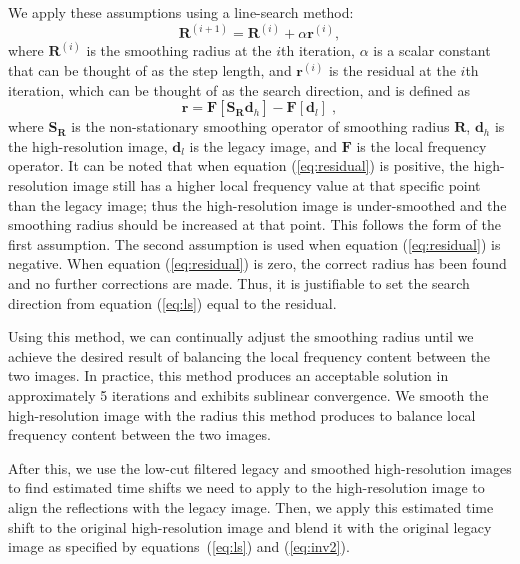     We apply these assumptions using a line-search method:
    \begin{equation}
        \label{eq:linesearch}
        \mathbf{R}^{(i+1)} = \mathbf{R}^{(i)}+ \alpha \mathbf{r}^{(i)},
    \end{equation}
    where $\mathbf{R}^{(i)}$ is the smoothing radius at the $i$th iteration, $\alpha$ is a scalar constant that can be thought of as the step length, and $\mathbf{r}^{(i)}$ is the residual at the $i$th iteration, which can be thought of as the search direction, and is
    defined as
    \begin{equation}
        \label{eq:residual}
        \mathbf{r} = \mathbf{F}[\mathbf{S}_{\mathbf{R}} \mathbf{d}_h] - \mathbf{F}[\mathbf{d}_l]\;,
    \end{equation}
    where $\mathbf{S}_\mathbf{R}$ is the non-stationary smoothing operator of smoothing radius $\mathbf{R}$, $\mathbf{d}_h$ is the high-resolution image, $\mathbf{d}_l$ is the legacy image, and $\mathbf{F}$ is the local frequency operator.
    It can be noted that when equation (\ref{eq:residual}) is positive, the high-resolution image still has a higher local frequency value at that specific point than the legacy image; thus the high-resolution image is under-smoothed and the smoothing radius should be increased at that point. 
    This follows the form of the first assumption. 
    The second assumption is used when equation (\ref{eq:residual}) is negative. 
    When equation (\ref{eq:residual}) is zero, the correct radius has been found and no further corrections are made. 
    Thus, it is justifiable to set the search direction from equation (\ref{eq:ls}) equal to the residual.
    
    Using this method, we can continually adjust the smoothing radius until we achieve the desired result of balancing the local frequency content between the two images.
    In practice, this method produces an acceptable solution in approximately 5 iterations and exhibits sublinear convergence. 
    We smooth the high-resolution image with the radius this method produces to balance local frequency content between the two images.
    
    After this, we use the low-cut filtered legacy and smoothed high-resolution images to find estimated time shifts we need to apply to the high-resolution image to align the reflections with the legacy image. 
    Then, we apply this estimated time shift to the original high-resolution image and blend it with the original legacy image as specified by equations~(\ref{eq:ls}) and (\ref{eq:inv2}).
    
